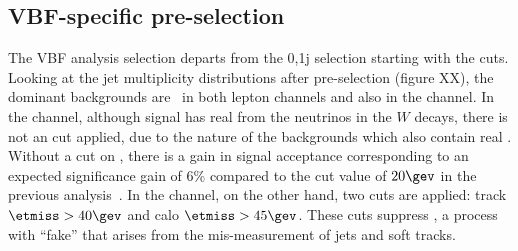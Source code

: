 
\subsection{VBF-specific pre-selection}
\label{subsec:vbf_select}

The VBF analysis selection departs from the 0,1j selection starting
with the \etmiss cuts. Looking at the jet multiplicity distributions
after pre-selection (figure XX), the dominant backgrounds are \ttbar~in
both lepton channels and also \ZDY in the \eemm channel. In the \emme
channel, although signal has real \etmiss from the neutrinos in the
$W$ decays, there is not an \etmiss cut applied, due to the nature of
the backgrounds which also contain real \etmiss. Without a cut on
\etmiss, there is a gain in signal acceptance corresponding to an expected
significance gain of 6\% compared to the cut value of $20 \gev$ in the previous
analysis~\cite{bib:hww_moriond_2013}. In the \eemm channel, on the other hand, two cuts are
applied: track $\etmiss>40 \gev$ and calo $\etmiss>45 \gev$. These
cuts suppress \ZDY, a process with ``fake'' \etmiss that arises from
the mis-measurement of jets and soft tracks. 

